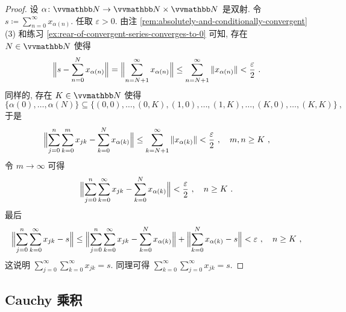 \begin{proof}
    设 \(\alpha \colon \N \to \N \times \N\) 是双射. 令 \(s \coloneqq \sum_{n = 0}^\infty x_{\alpha(n)}\). 任取 \(\varepsilon > 0\). 由注 \ref{rem:absolutely-and-conditionally-convergent}(3) 和练习 \ref{ex:rear-of-convergent-series-converges-to-0} 可知, 存在 \(N \in \N\) 使得
    \[
        \Bigl\| s - \sum_{n = 0}^N x_{\alpha(n)} \Bigr\| = \Bigl\| \sum_{n = N + 1}^\infty x_{\alpha(n)} \Bigr\| \leq \sum_{n = N + 1}^\infty \|x_{\alpha(n)}\| < \frac{\varepsilon}{2}\ .
    \]
    同样的, 存在 \(K \in \N\) 使得
    \[
        \bigl\{ \alpha(0), \ldots, \alpha(N) \bigr\} \subseteq \bigl\{ (0, 0), \ldots, (0, K), (1, 0), \ldots, (1, K), \ldots, (K, 0), \ldots, (K, K) \bigr\}\ ,
    \]
    于是
    \[
        \Bigl\| \sum_{j = 0}^n \sum_{k = 0}^m x_{j k} - \sum_{k = 0}^N x_{\alpha(k)} \Bigr\| \leq \sum_{k = N + 1}^\infty \|x_{\alpha(k)}\| < \frac{\varepsilon}{2}\ ,\quad m, n \geq K\ ,
    \]
    令 \(m \to \infty\) 可得
    \[
        \Bigl\| \sum_{j = 0}^n \sum_{k = 0}^\infty x_{j k} - \sum_{k = 0}^N x_{\alpha(k)} \Bigr\| < \frac{\varepsilon}{2}\ ,\quad n \geq K\ .
    \]
    最后
    \[
        \Bigl\| \sum_{j = 0}^n \sum_{k = 0}^\infty x_{j k} - s \Bigr\| \leq \Bigl\| \sum_{j = 0}^n \sum_{k = 0}^\infty x_{j k} - \sum_{k = 0}^N x_{\alpha(k)} \Bigr\| + \Bigl\| \sum_{k = 0}^N x_{\alpha(k)} - s \Bigr\| < \varepsilon\ ,\quad n \geq K\ ,
    \]
    这说明 \(\sum_{j = 0}^\infty \sum_{k = 0}^\infty x_{j k} = s\). 同理可得 \(\sum_{k = 0}^\infty \sum_{j = 0}^\infty x_{j k} = s\).
\end{proof}

\subsection{Cauchy 乘积}

